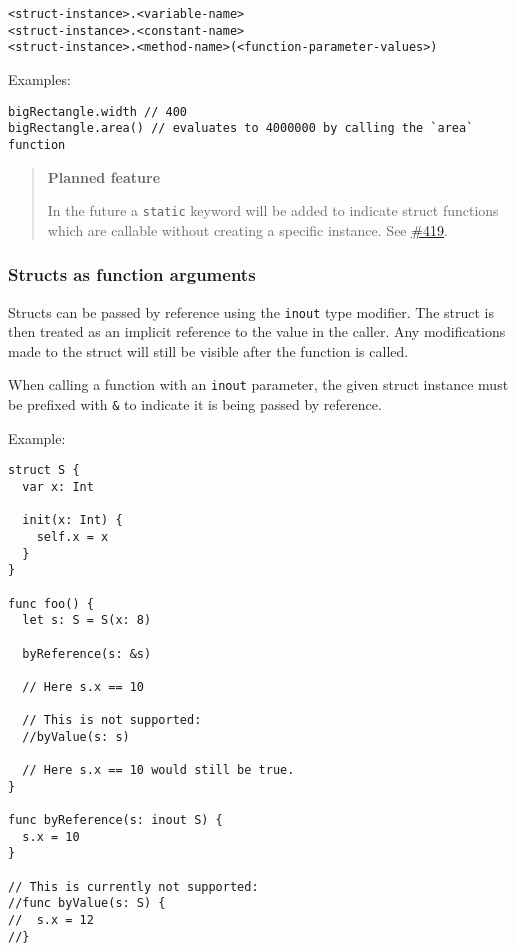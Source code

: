 \begin{verbatim}
<struct-instance>.<variable-name>
<struct-instance>.<constant-name>
<struct-instance>.<method-name>(<function-parameter-values>)
\end{verbatim}

Examples:

\begin{verbatim}
bigRectangle.width // 400
bigRectangle.area() // evaluates to 4000000 by calling the `area` function
\end{verbatim}

\begin{quote}
\textbf{Planned feature}

In the future a \texttt{static} keyword will be added to indicate struct functions which are callable without creating a specific instance. See \href{https://github.com/flintlang/flint/issues/419}{\#419}.
\end{quote}

\subsubsection{Structs as function arguments}
\label{sec:appendix-b-structs-as-function-arguments}

Structs can be passed by reference using the \texttt{inout} type modifier. The struct is then treated as an implicit reference to the value in the caller. Any modifications made to the struct will still be visible after the function is called.

When calling a function with an \texttt{inout} parameter, the given struct instance must be prefixed with \texttt{&} to indicate it is being passed by reference.

Example:

\begin{verbatim}
struct S {
  var x: Int

  init(x: Int) {
    self.x = x
  }
}

func foo() {
  let s: S = S(x: 8)

  byReference(s: &s)

  // Here s.x == 10

  // This is not supported:
  //byValue(s: s)

  // Here s.x == 10 would still be true.
}

func byReference(s: inout S) {
  s.x = 10
}

// This is currently not supported:
//func byValue(s: S) {
//  s.x = 12
//}
\end{verbatim}

